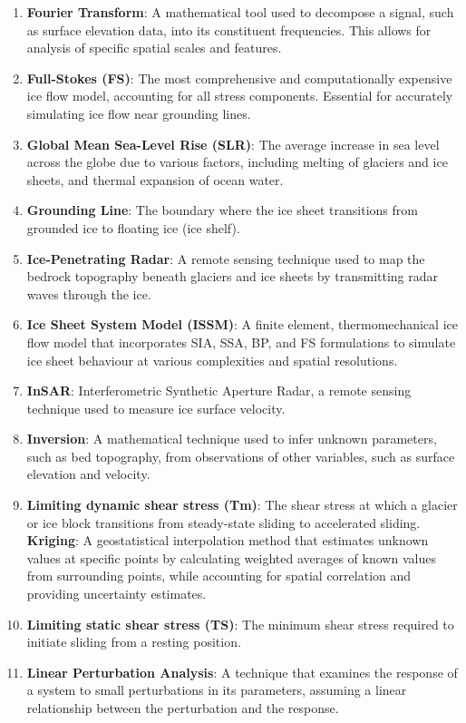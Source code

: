 \begin{enumerate}
\item \textbf{Fourier Transform}: A mathematical tool used to decompose a signal, such as surface elevation data, into its constituent frequencies. This allows for analysis of specific spatial scales and features.
\item \textbf{Full-Stokes (FS)}: The most comprehensive and computationally expensive ice flow model, accounting for all stress components. Essential for accurately simulating ice flow near grounding lines.
\item \textbf{Global Mean Sea-Level Rise (SLR)}: The average increase in sea level across the globe due to various factors, including melting of glaciers and ice sheets, and thermal expansion of ocean water.
\item \textbf{Grounding Line}: The boundary where the ice sheet transitions from grounded ice to floating ice (ice shelf).
\item \textbf{Ice-Penetrating Radar}: A remote sensing technique used to map the bedrock topography beneath glaciers and ice sheets by transmitting radar waves through the ice.
\item \textbf{Ice Sheet System Model (ISSM)}: A finite element, thermomechanical ice flow model that incorporates SIA, SSA, BP, and FS formulations to simulate ice sheet behaviour at various complexities and spatial resolutions.
\item \textbf{InSAR}: Interferometric Synthetic Aperture Radar, a remote sensing technique used to measure ice surface velocity.
\item \textbf{Inversion}: A mathematical technique used to infer unknown parameters, such as bed topography, from observations of other variables, such as surface elevation and velocity.
\item \textbf{Limiting dynamic shear stress (Tm)}: The shear stress at which a glacier or ice block transitions from steady-state sliding to accelerated sliding.
\textbf{Kriging}: A geostatistical interpolation method that estimates unknown values at specific points by calculating weighted averages of known values from surrounding points, while accounting for spatial correlation and providing uncertainty estimates.
\item \textbf{Limiting static shear stress (TS)}: The minimum shear stress required to initiate sliding from a resting position.
\item \textbf{Linear Perturbation Analysis}: A technique that examines the response of a system to small perturbations in its parameters, assuming a linear relationship between the perturbation and the response.

\end{enumerate}
